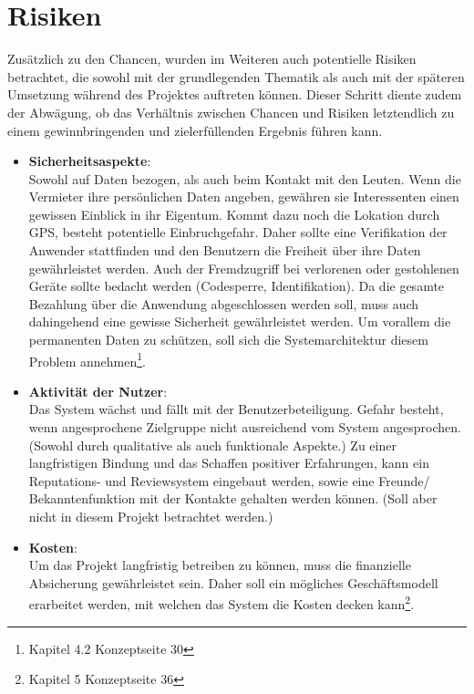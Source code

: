 
\section{Risiken}
Zusätzlich zu den Chancen, wurden im Weiteren auch potentielle Risiken betrachtet, die sowohl mit der grundlegenden Thematik als auch mit der späteren Umsetzung während des Projektes auftreten können.
Dieser Schritt diente zudem der Abwägung, ob das Verhältnis zwischen Chancen und Risiken letztendlich zu einem gewinnbringenden und zielerfüllenden Ergebnis führen kann.

\begin{itemize}
   \item \textbf{Sicherheitsaspekte}:\\ Sowohl auf Daten bezogen, als auch beim Kontakt mit den Leuten. Wenn die Vermieter ihre persönlichen Daten angeben, gewähren sie Interessenten einen gewissen Einblick in ihr Eigentum. Kommt dazu noch die Lokation durch GPS, besteht potentielle Einbruchgefahr. Daher sollte eine Verifikation der Anwender stattfinden und den Benutzern die Freiheit über ihre Daten gewährleistet werden. Auch der Fremdzugriff bei verlorenen oder gestohlenen Geräte sollte bedacht werden (Codesperre, Identifikation). Da die gesamte Bezahlung über die Anwendung abgeschlossen werden soll, muss auch dahingehend eine gewisse Sicherheit gewährleistet werden. Um vorallem die permanenten Daten zu schützen, soll sich die Systemarchitektur diesem Problem annehmen\footnote{Kapitel 4.2 Konzeptseite 30}.

   \item \textbf{Aktivität der Nutzer}:\\ Das System wächst und fällt mit der Benutzerbeteiligung. Gefahr besteht, wenn angesprochene Zielgruppe nicht ausreichend vom System angesprochen. (Sowohl durch qualitative als auch funktionale Aspekte.) Zu einer langfristigen Bindung und das Schaffen positiver Erfahrungen, kann ein Reputations- und Reviewsystem eingebaut werden, sowie eine Freunde/ Bekanntenfunktion mit der Kontakte gehalten werden können. (Soll aber nicht in diesem Projekt betrachtet werden.)

   \item \textbf{Kosten}:\\ Um das Projekt langfristig betreiben zu können, muss die finanzielle Absicherung gewährleistet sein. Daher soll ein mögliches Geschäftsmodell erarbeitet werden, mit welchen das System die Kosten decken kann\footnote{Kapitel 5 Konzeptseite 36}.


\end{itemize}
